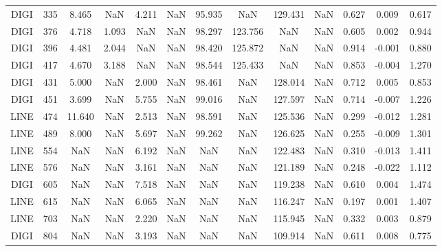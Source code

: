 \begin{table}[h]
\begin{tabular}{ccccccccccccc}
		DIGI & 335    & 8.465      & NaN        & 4.211      & NaN        & 95.935 & NaN     & 129.431 & NaN    & 0.627     & 0.009    & 0.617     \\
		\rowcolor[HTML]{EFEFEF} 
		DIGI & 376    & 4.718      & 1.093      & NaN        & NaN        & 98.297 & 123.756 & NaN     & NaN    & 0.605     & 0.002    & 0.944     \\
		DIGI & 396    & 4.481      & 2.044      & NaN        & NaN        & 98.420 & 125.872 & NaN     & NaN    & 0.914     & -0.001   & 0.880     \\
		\rowcolor[HTML]{EFEFEF} 
		DIGI & 417    & 4.670      & 3.188      & NaN        & NaN        & 98.544 & 125.433 & NaN     & NaN    & 0.853     & -0.004   & 1.270     \\
		DIGI & 431    & 5.000      & NaN        & 2.000      & NaN        & 98.461 & NaN     & 128.014 & NaN    & 0.712     & 0.005    & 0.853     \\
		\rowcolor[HTML]{EFEFEF} 
		DIGI & 451    & 3.699      & NaN        & 5.755      & NaN        & 99.016 & NaN     & 127.597 & NaN    & 0.714     & -0.007   & 1.226     \\
		LINE & 474    & 11.640     & NaN        & 2.513      & NaN        & 98.591 & NaN     & 125.536 & NaN    & 0.299     & -0.012   & 1.281     \\
		\rowcolor[HTML]{EFEFEF} 
		LINE & 489    & 8.000      & NaN        & 5.697      & NaN        & 99.262 & NaN     & 126.625 & NaN    & 0.255     & -0.009   & 1.301     \\
		LINE & 554    & NaN        & NaN        & 6.192      & NaN        & NaN    & NaN     & 122.483 & NaN    & 0.310     & -0.013   & 1.411     \\
		\rowcolor[HTML]{EFEFEF} 
		LINE & 576    & NaN        & NaN        & 3.161      & NaN        & NaN    & NaN     & 121.189 & NaN    & 0.248     & -0.022   & 1.112     \\
		DIGI & 605    & NaN        & NaN        & 7.518      & NaN        & NaN    & NaN     & 119.238 & NaN    & 0.610     & 0.004    & 1.474     \\
		\rowcolor[HTML]{EFEFEF} 
		LINE & 615    & NaN        & NaN        & 6.065      & NaN        & NaN    & NaN     & 116.247 & NaN    & 0.197     & 0.001    & 1.407     \\
		LINE & 703    & NaN        & NaN        & 2.220      & NaN        & NaN    & NaN     & 115.945 & NaN    & 0.332     & 0.003    & 0.879     \\
		\rowcolor[HTML]{EFEFEF} 
		DIGI & 804    & NaN        & NaN        & 3.193      & NaN        & NaN    & NaN     & 109.914 & NaN    & 0.611     & 0.008    & 0.775     \\

\end{tabular}
\end{table}
